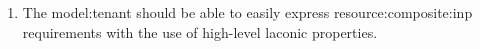 \begin{enumerate}[
    label=\textbf{NFR\arabic*},
    leftmargin=*,
    labelindent=1em
]
    \item \label{requirements:model:tenant:verbosity}
    The \gls{model:tenant} should be able to easily express \gls{resource:composite:inp} requirements with the use of high-level laconic properties.
\end{enumerate}